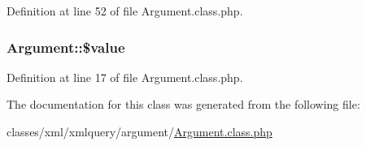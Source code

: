 Definition at line 52 of file Argument.\+class.\+php.

\hypertarget{classArgument_a762eb8881d615f61189bba09b9bd7300}{}
\subsubsection[{\$value}]{\setlength{\rightskip}{0pt plus 5cm}Argument\+::\$value}\label{classArgument_a762eb8881d615f61189bba09b9bd7300}


Definition at line 17 of file Argument.\+class.\+php.



The documentation for this class was generated from the following file\+:\begin{DoxyCompactItemize}
\item 
classes/xml/xmlquery/argument/\hyperlink{Argument_8class_8php}{Argument.\+class.\+php}\end{DoxyCompactItemize}
